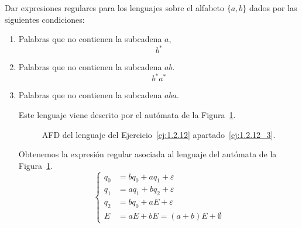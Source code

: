 \begin{ejercicio} \label{ej:1.2.12}
    Dar expresiones regulares para los lenguajes sobre el alfabeto $\{a, b\}$ dados por las siguientes condiciones:
    \begin{enumerate}
        \item Palabras que no contienen la subcadena $a$,
        \begin{equation*}
            b^*
        \end{equation*}
        \item Palabras que no contienen la subcadena $ab$.
        \begin{equation*}
            b^*a^*
        \end{equation*}
        \item \label{ej:1.2.12_3} %
        Palabras que no contienen la subcadena $aba$.
        
        Este lenguaje viene descrito por el autómata de la Figura~\ref{fig:ej:1.2.12_3}.
        \begin{figure}
            \centering
            \caption{AFD del lenguaje del Ejercicio~\ref{ej:1.2.12} apartado~\ref{ej:1.2.12_3}.}
            \label{fig:ej:1.2.12_3}
        \end{figure}

        Obtenemos la expresión regular asociada al lenguaje del autómata de la Figura~\ref{fig:ej:1.2.12_3}.
        \begin{equation*}
            \begin{cases}
                q_0 &= bq_0 + aq_1 + \varepsilon\\
                q_1 &= aq_1 + bq_2 + \varepsilon\\
                q_2 &= bq_0 + aE + \varepsilon\\
                E &= aE + bE = (a+b)E + \emptyset
            \end{cases}
        \end{equation*}


\end{enumerate}
\end{ejercicio}
